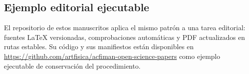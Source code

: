 \subsection{Ejemplo editorial ejecutable}
El repositorio de estos manuscritos aplica el mismo patrón a una tarea editorial: fuentes LaTeX versionadas, comprobaciones automáticas y PDF actualizados en rutas estables. Su código y sus manifiestos están disponibles en \url{https://github.com/artfisica/acfiman-open-science-papers} como ejemplo ejecutable de conservación del procedimiento.

